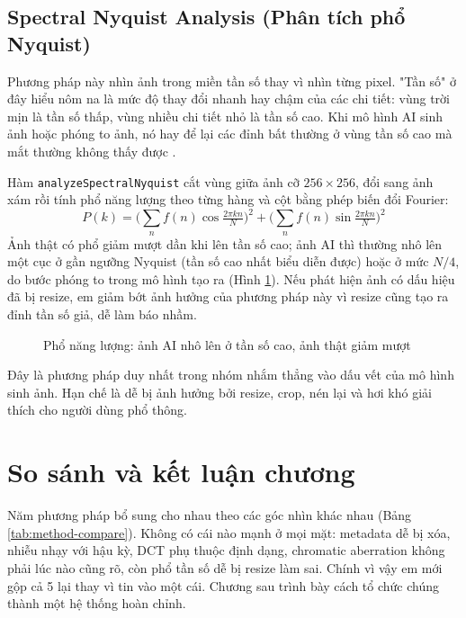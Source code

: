 \documentclass[14pt,a4paper,oneside]{report}
\begin{document}
\subsection{Spectral Nyquist Analysis (Phân tích phổ Nyquist)}
Phương pháp này nhìn ảnh trong miền tần số thay vì nhìn từng pixel. "Tần số" ở đây hiểu nôm na là mức độ thay đổi nhanh hay chậm của các chi tiết: vùng trời mịn là tần số thấp, vùng nhiều chi tiết nhỏ là tần số cao. Khi mô hình AI sinh ảnh hoặc phóng to ảnh, nó hay để lại các đỉnh bất thường ở vùng tần số cao mà mắt thường không thấy được \cite{durall2020,wang2020}.

Hàm \texttt{analyzeSpectralNyquist} cắt vùng giữa ảnh cỡ $256\times256$, đổi sang ảnh xám rồi tính phổ năng lượng theo từng hàng và cột bằng phép biến đổi Fourier:
\[
P(k)=\Big(\sum_{n} f(n)\cos\tfrac{2\pi kn}{N}\Big)^2+\Big(\sum_{n} f(n)\sin\tfrac{2\pi kn}{N}\Big)^2
\]
Ảnh thật có phổ giảm mượt dần khi lên tần số cao; ảnh AI thì thường nhô lên một cục ở gần ngưỡng Nyquist (tần số cao nhất biểu diễn được) hoặc ở mức $N/4$, do bước phóng to trong mô hình tạo ra (Hình \ref{fig:spectral-curve}). Nếu phát hiện ảnh có dấu hiệu đã bị resize, em giảm bớt ảnh hưởng của phương pháp này vì resize cũng tạo ra đỉnh tần số giả, dễ làm báo nhầm.

\begin{figure}[H]
\centering
{}
\caption{Phổ năng lượng: ảnh AI nhô lên ở tần số cao, ảnh thật giảm mượt}
\label{fig:spectral-curve}
\end{figure}

Đây là phương pháp duy nhất trong nhóm nhắm thẳng vào dấu vết của mô hình sinh ảnh. Hạn chế là dễ bị ảnh hưởng bởi resize, crop, nén lại và hơi khó giải thích cho người dùng phổ thông.

\section{So sánh và kết luận chương}
Năm phương pháp bổ sung cho nhau theo các góc nhìn khác nhau (Bảng \ref{tab:method-compare}). Không có cái nào mạnh ở mọi mặt: metadata dễ bị xóa, nhiễu nhạy với hậu kỳ, DCT phụ thuộc định dạng, chromatic aberration không phải lúc nào cũng rõ, còn phổ tần số dễ bị resize làm sai. Chính vì vậy em mới gộp cả 5 lại thay vì tin vào một cái. Chương sau trình bày cách tổ chức chúng thành một hệ thống hoàn chỉnh.
\end{document}
